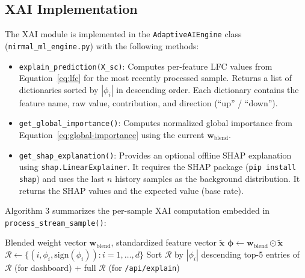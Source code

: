 \subsection{XAI Implementation}
\label{sec:meth-xai-impl}

The XAI module is implemented in the \texttt{AdaptiveAIEngine} class
(\texttt{nirmal\_\allowbreak ml\_\allowbreak engine.py}) with the following methods:

\begin{itemize}[leftmargin=*, itemsep=0.4em]

    \item \texttt{explain\_\allowbreak prediction(X\_sc)}:
    Computes per-feature LFC values from Equation~\ref{eq:lfc} for the
    most recently processed sample. Returns a list of dictionaries
    sorted by $|\phi_i|$ in descending order. Each dictionary contains
    the feature name, raw value, contribution, and direction
    (``up'' / ``down'').

    \item \texttt{get\_\allowbreak global\_\allowbreak importance()}:
    Computes normalized global importance from
    Equation~\ref{eq:global-importance} using the current
    $\mathbf{w}_{\mathrm{blend}}$.

    \item \texttt{get\_\allowbreak shap\_\allowbreak explanation()}:
    Provides an optional offline SHAP explanation using
    \texttt{shap.\allowbreak LinearExplainer}. It requires the SHAP package
    (\texttt{pip install shap}) and uses the last $n$ history samples
    as the background distribution. It returns the SHAP values and
    the expected value (base rate).

\end{itemize}

Algorithm 3 summarizes the per-sample XAI computation embedded in
\texttt{process\_\allowbreak stream\_\allowbreak sample()}:

\begin{algorithm}[htbp]
\caption{Per-sample LFC Explainability (appended to Algorithm~\ref{alg:decision-engine})}
\label{alg:xai}
\begin{algorithmic}[1]
\Require Blended weight vector $\mathbf{w}_{\mathrm{blend}}$, standardized feature vector $\tilde{\mathbf{x}}$
\State $\boldsymbol{\phi} \gets \mathbf{w}_{\mathrm{blend}} \odot \tilde{\mathbf{x}}$ 
\State $\mathcal{R} \gets \{(i, \phi_i, \mathrm{sign}(\phi_i)) : i = 1,\ldots,d\}$ 
\State Sort $\mathcal{R}$ by $|\phi_i|$ descending
\State \Return top-5 entries of $\mathcal{R}$ (for dashboard) + full $\mathcal{R}$ (for \texttt{/api/explain})
\end{algorithmic}
\end{algorithm}

